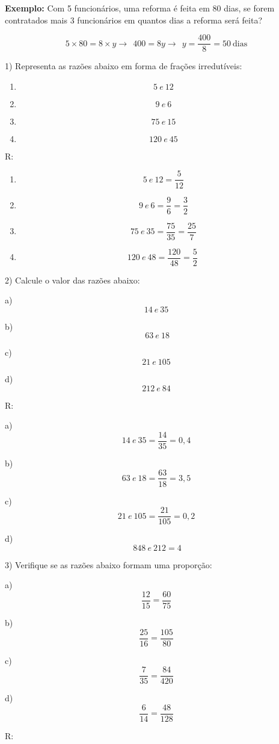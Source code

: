 \textbf{Exemplo:} Com 5 funcionários, uma reforma é feita em 80 dias, se
forem contratados mais 3 funcionários em quantos dias a reforma será
feita?

\[5 \times 80 = 8 \times y \rightarrow \ \ 400 = 8y \rightarrow \ \ y = \frac{400}{8} = 50\ \text{dias}\]


1) Representa as razões abaixo em forma de frações irredutíveis:

\begin{enumerate}
\def\labelenumi{\alph{enumi})}
\item
  \[5\ e\ 12\]
\item
  \[9\ e\ 6\]
\item
  \[75\ e\ 15\]
\item
  \[120\ e\ 45\]
\end{enumerate}

R:

\begin{enumerate}
\def\labelenumi{\alph{enumi})}
\item
  \[5\ e\ 12 = \frac{5}{12}\]
\item
  \[9\ e\ 6 = \frac{9}{6} = \frac{3}{2}\]
\item
  \[75\ e\ 35 = \frac{75}{35} = \frac{25}{7}\]
\item
  \[120\ e\ 48 = \frac{120}{48} = \frac{5}{2}\ \]
\end{enumerate}

2) Calcule o valor das razões abaixo:

a) \[14\ e\ 35\]

b) \[\ 63\ e\ 18\]

c) \[21\ e\ 105\]

d) \[212\ e\ 84\]

R:

a) \[14\ e\ 35 = \frac{14}{35} = 0,4\]

b) \[63\ e\ 18 = \frac{63}{18} = 3,5\]

c) \[21\ e\ 105 = \frac{21}{105} = 0,2\]

d) \[\ 848\ e\ 212 = 4\]

3) Verifique se as razões abaixo formam uma proporção:

a) \[\frac{12}{15} = \frac{60}{75}\]

b) \[\frac{25}{16} = \frac{105}{80}\]

c) \[\frac{7}{35} = \frac{84}{420}\]

d) \[\frac{6}{14} = \frac{48}{128}\]

R:

